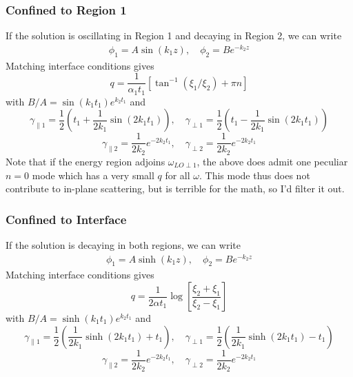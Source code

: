 \documentclass{article}
\begin{document}
\subsubsection{Confined to Region 1}
If the solution is oscillating in Region 1 and decaying in Region 2, we can write
\begin{align}
  \phi_1=A\sin(k_1 z), \quad \phi_2=Be^{-k_2z}
\end{align}
Matching interface conditions gives
\begin{equation}
  q=\frac{1}{\alpha_1 t_1}\left[ \tan^{-1}\left( \xi_1/\xi_2 \right) +\pi n \right]
\end{equation}
with $B/A=\sin(k_1 t_1)e^{k_2t_1}$ and
\begin{equation}
  \gamma_{\parallel 1}=\frac{1}{2}(t_1+\frac{1}{2k_1}\sin(2k_1t_1)), \quad 
  \gamma_{\perp     1}=\frac{1}{2}(t_1-\frac{1}{2k_1}\sin(2k_1t_1))
\end{equation}
\begin{equation}
  \gamma_{\parallel 2}=\frac{1}{2k_2}e^{-2k_2t_1}, \quad 
  \gamma_{\perp     2}=\frac{1}{2k_2}e^{-2k_2t_1}
\end{equation}
Note that if the energy region adjoins $\omega_{LO\perp 1}$, the above does admit one peculiar $n=0$ mode which has a very small $q$ for all $\omega$.  This mode thus does not contribute to in-plane scattering, but is terrible for the math, so I'd filter it out.


\subsubsection{Confined to Interface}
If the solution is decaying in both regions, we can write
\begin{align}
  \phi_1=A\sinh(k_1 z), \quad \phi_2=Be^{-k_2z}
\end{align}
Matching interface conditions gives
\begin{equation}
  q=\frac{1}{2\alpha t_1}\log\left[ \frac{\xi_2+\xi_1}{\xi_2-\xi_1} \right]
\end{equation}
with $B/A=\sinh(k_1t_1)e^{k_2t_1}$ and
\begin{equation}
  \gamma_{\parallel 1}=\frac{1}{2}\left(\frac{1}{2k_1}\sinh(2k_1t_1)+t_1\right), \quad 
  \gamma_{\perp     1}=\frac{1}{2}\left(\frac{1}{2k_1}\sinh(2k_1t_1)-t_1\right)
\end{equation}
\begin{equation}
  \gamma_{\parallel 2}=\frac{1}{2k_2}e^{-2k_2t_1}, \quad 
  \gamma_{\perp     2}=\frac{1}{2k_2}e^{-2k_2t_1}
\end{equation}
\end{document}
